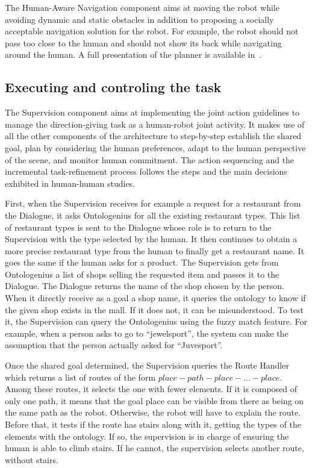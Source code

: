 The Human-Aware Navigation component aims at moving the robot while avoiding dynamic and static obstacles in addition to proposing a socially acceptable navigation solution for the robot. For example, the robot should not pass too close to the human and should not show its back while navigating around the human. A full presentation of the planner is available in~\cite{singamaneni_2020_hateb}.

\subsection{Executing and controling the task}

The Supervision component aims at implementing the joint action guidelines to manage the direction-giving task as a human-robot joint activity. It makes use of all the other components of the architecture to step-by-step establish the shared goal, plan by considering the human preferences, adapt to the human perspective of the scene, and monitor human commitment. The action sequencing and the incremental task-refinement process follows the steps and the main decisions exhibited in human-human studies. 

First, when the Supervision receives for example a request for a restaurant from the Dialogue, it asks Ontologenius for all the existing restaurant types. This list of restaurant types is sent to the Dialogue whose role is to return to the Supervision with the type selected by the human. It then continues to obtain a more precise restaurant type from the human to finally get a restaurant name. It goes the same if the human asks for a product. The Supervision gets from Ontologenius a list of shops selling the requested item and passes it to the Dialogue. The Dialogue returns the name of the shop chosen by the person. When it directly receive as a goal a shop name, it queries the ontology to know if the given shop exists in the mall. If it does not, it can be misunderstood. To test it, the Supervision can query the Ontologenius using the fuzzy match feature. For example, when a person asks to go to ``jewelsport'', the system can make the assumption that the person actually asked for ``Juvesport''.

Once the shared goal determined, the Supervision queries the Route Handler which returns a list of routes of the form $place - path - place - ... - place$. Among these routes, it selects the one with fewer elements. If it is composed of only one path, it means that the goal place can be visible from there as being on the same path as the robot. Otherwise, the robot will have to explain the route. Before that, it tests if the route has stairs along with it, getting the types of the elements with the ontology. If so, the supervision is in charge of ensuring the human is able to climb stairs. If he cannot, the supervision selects another route, without stairs.

